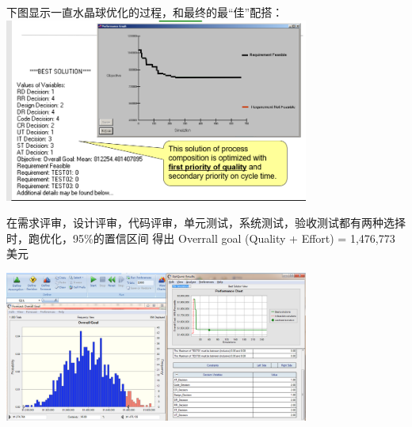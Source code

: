 下图显示一直水晶球优化的过程，和最终的最``佳''配搭：\\

\includegraphics[width=10cm]{HmttOptScreenshot_2021-10-08_165653.png}

在需求评审，设计评审，代码评审，单元测试，系统测试，验收测试都有两种选择时，跑优化，95\%的置信区间
得出 Overrall goal (Quality + Effort) = 1,476,773美元


\includegraphics[width=10cm]{微信截图_20211103023018.png}



